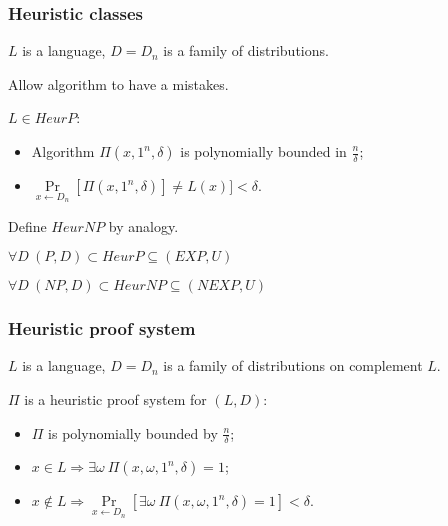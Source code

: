 \begin{frame}
    \frametitle{Heuristic classes}

    $L$ is a language, $D = {D_n}$ is a family of distributions.

    Allow algorithm to have a mistakes.

    \pause
    \begin{definition}
        $L \in HeurP$:
        \begin{itemize}
            \item Algorithm $\Pi(x, 1^n, \delta)$ is polynomially bounded in $\frac{n}{\delta}$;
            \item $\Pr\limits_{x \gets D_n}[\Pi(x, 1^n, \delta)] \neq
        		L(x)] < \delta$.
        \end{itemize}
    \end{definition}

    Define $HeurNP$ by analogy.

    \pause

    \vspace{0.5cm}
    $\forall D~ (P, D) \subset HeurP \subseteq (EXP, U)$
    
    $\forall D~ (NP, D) \subset HeurNP \subseteq (NEXP, U)$
\end{frame}

\begin{frame}
    \frametitle{Heuristic proof system}

    $L$ is a language, $D = {D_n}$ is a family of distributions on
    complement $L$.

    \pause
    \begin{definition}
        $\Pi$ is a heuristic proof system for $(L, D)$:
        \begin{itemize}
            \item $\Pi$ is polynomially bounded by $\frac{n}{\delta}$;
            \item $x \in L \Rightarrow \exists \omega~\Pi(x, \omega,
        		1^n, \delta) = 1$;
            \item $x \notin L \Rightarrow
        		\Pr\limits_{x \gets D_n}[\exists \omega~
                \Pi(x, \omega, 1^n, \delta) = 1] < \delta$.
        \end{itemize}
    \end{definition}
    
\end{frame}

